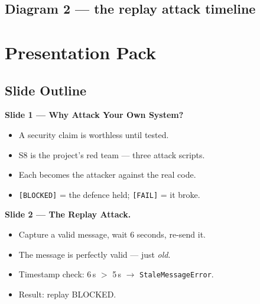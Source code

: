 \documentclass[11pt,a4paper]{article}
\begin{document}
\subsection{Diagram 2 --- the replay attack timeline}
\begin{center}
\end{center}

\section{Presentation Pack}

\subsection{Slide Outline}

\textbf{Slide 1 --- Why Attack Your Own System?}
\begin{itemize}
  \item A security claim is worthless until tested.
  \item S8 is the project's red team --- three attack scripts.
  \item Each becomes the attacker against the real code.
  \item \texttt{[BLOCKED]} = the defence held; \texttt{[FAIL]} = it broke.
\end{itemize}

\textbf{Slide 2 --- The Replay Attack.}
\begin{itemize}
  \item Capture a valid message, wait 6 seconds, re-send it.
  \item The message is perfectly valid --- just \emph{old}.
  \item Timestamp check: 6\,s $>$ 5\,s $\to$ \texttt{StaleMessageError}.
  \item Result: replay BLOCKED.
\end{itemize}
\end{document}
